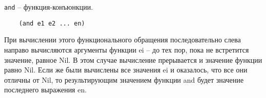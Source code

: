\texttt{and} -- функция-конъюнкции.

\begin{lstlisting}
	(and e1 e2 ... en)
\end{lstlisting}

При  вычислении этого  функционального обращения последовательно слева направо вычисляются аргументы функции ei -- до тех пор, пока не встретится значение, равное Nil. В этом случае вычисление прерывается и значение функции равно Nil. Если же были вычислены все значения ei и оказалось,  что все  они отличны  от Nil,  то  результирующим значением функции and будет значение последнего выражения en. 
